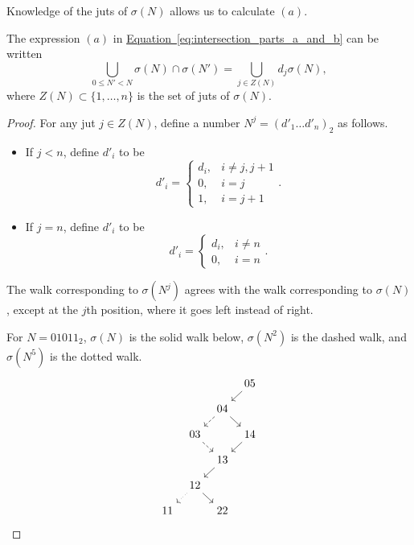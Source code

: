 \documentclass[main.tex]{subfiles}
\begin{document}
Knowledge of the juts of $\sigma(N)$ allows us to calculate $(a)$.

\begin{lemma}
  \label{lemma:expression_for_a_in_terms_of_juts}
  The expression $(a)$ in \hyperref[eq:intersection_parts_a_and_b]{Equation~\ref*{eq:intersection_parts_a_and_b}} can be written
  \begin{equation*}
    \bigcup_{0 \leq N' < N} \sigma(N) \cap \sigma(N') = \bigcup_{j \in Z(N)} d_{j} \sigma(N),
  \end{equation*}
  where $Z(N) \subset \{1, \ldots, n\}$ is the set of juts of $\sigma(N)$.
\end{lemma}
\begin{proof}
  For any jut $j \in Z(N)$, define a number $N^{j} = (d'_{1}\ldots d'_{n})_{2}$ as follows.
  \begin{itemize}
    \item If $j < n$, define $d'_{i}$ to be
      \begin{equation*}
        d'_{i} =
        \begin{cases}
          d_{i}, &i \neq j, j+1 \\
          0, &i = j \\
          1, &i = j+1
        \end{cases}.
      \end{equation*}


    \item If $j = n$, define $d'_{i}$ to be
      \begin{equation*}
        d'_{i} =
        \begin{cases}
          d_{i}, & i \neq n \\
          0, & i = n
        \end{cases}.
      \end{equation*}
  \end{itemize}
  The walk corresponding to $\sigma(N^{j})$ agrees with the walk corresponding to $\sigma(N)$, except at the $j$th position, where it goes left instead of right.

  For $N = 01011_{2}$, $\sigma(N)$ is the solid walk below, $\sigma(N^{2})$ is the dashed walk, and $\sigma(N^{5})$ is the dotted walk.
  \begin{equation*}
    \begin{tikzcd}[column sep=tiny, row sep=small]
      &&& 05
      \arrow[dl]
      \\
      && 04
      \arrow[dr]
      \arrow[dl, dashed]
      \\
      & 03
      \arrow[dr, dashed]
      && 14
      \arrow[dl]
      \\
      & & 13
      \arrow[dl]
      \\
      & 12
      \arrow[dr]
      \arrow[dl, dotted]
      \\
      11
      && 22
    \end{tikzcd}
  \end{equation*}


\end{proof}
\end{document}
